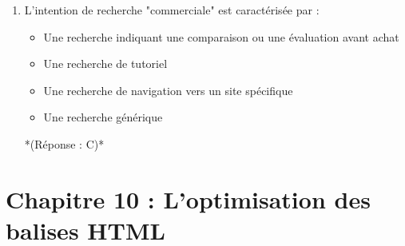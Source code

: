 \documentclass[12pt,a4paper,twoside]{report}
\begin{document}
\begin{enumerate}
\item L'intention de recherche "commerciale" est caractérisée par :
\begin{itemize}
\item[A)] Une recherche indiquant une comparaison ou une évaluation avant achat
\item[B)] Une recherche de tutoriel
\item[C)] Une recherche de navigation vers un site spécifique
\item[D)] Une recherche générique
\end{itemize}
*(Réponse : C)*
\end{enumerate}

\newpage

\section*{Chapitre 10 : L'optimisation des balises HTML}
\end{document}
